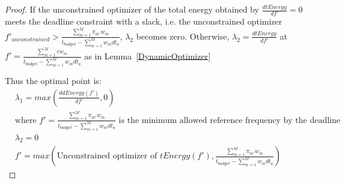 \documentclass[11pt, letterpaper]{article}
\begin{document}
\begin{proof}
If the unconstrained optimizer of the total energy obtained by $\frac{dtEnergy}{df'} = 0$ meets the deadline constraint with a slack, i.e. the unconstrained optimizer $f'_{unconstrained} > \frac{\sum_{m=1}^{M}\pi_{m'}w_m}{t_{budget} - \sum_{m=1}^{M}w_mdt_a}$, $\lambda_2$ becomes zero. Otherwise, $\lambda_2 =  \frac{dtEnergy}{df'}$ at $f' = \frac{\sum_{m=1}^{M}cw_m}{t_{budget} - \sum_{m=1}^{M}w_mdt_a}$ as in Lemma~\ref{DynamicOptimizer}

Thus the optimal point is:
\begin{displaymath}
\begin{aligned}
&\lambda_1 = max(\frac{ddEnergy(f')}{df'}, 0) \\
&\text{where } f' =  \frac{\sum_{m=1}^{M}\pi_{m'}w_m}{t_{budget} - \sum_{m=1}^{M}w_mdt_a}  \text{ is the minimum allowed reference frequency by the deadline}\\
&\lambda_2 = 0\\
&f' = max(\text{Unconstrained optimizer of }  tEnergy(f'),  \frac{\sum_{m=1}^{M}\pi_{m'}w_m}{t_{budget} - \sum_{m=1}^{M}w_mdt_a})
\end{aligned}
\end{displaymath}
\end{proof}
\end{document}
